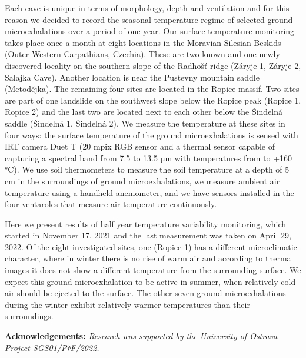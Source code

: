 {Each cave is unique in terms of morphology, depth and ventilation and for this reason we decided to record the seasonal temperature regime of selected ground microexhalations over a period of one year. Our surface temperature monitoring takes place once a month at eight locations in the Moravian-Silesian Beskids (Outer Western Carpathians, Czechia). These are two known and one newly discovered locality on the southern slope of the Radhošť ridge (Záryje 1, Záryje 2, Salajka Cave). Another location is near the Pustevny mountain saddle (Metodějka). The remaining four sites are located in the Ropice massif. Two sites are part of one landslide on the southwest slope below the Ropice peak (Ropice 1, Ropice 2) and the last two are located next to each other below the Šindelná saddle (Šindelná 1, Šindelná 2). We measure the temperature at these sites in four ways: the surface temperature of the ground microexhalations is sensed with IRT camera Duet T (20 mpix RGB sensor and a thermal sensor capable of capturing a spectral band from 7.5 to 13.5 µm with temperatures from  to +160 °C). We use soil thermometers to measure the soil temperature at a depth of 5 cm in the surroundings of ground microexhalations, we measure ambient air temperature using a handheld anemometer, and we have sensors installed in the four ventaroles that measure air temperature continuously.

Here we present results of half year temperature variability monitoring, which started in November 17, 2021 and the last measurement was taken on April 29, 2022. Of the eight investigated sites, one (Ropice 1) has a different microclimatic character, where in winter there is no rise of warm air and according to thermal images it does not show a different temperature from the surrounding surface. We expect this ground microexhalation to be active in summer, when relatively cold air should be ejected to the surface. The other seven ground microexhalations during the winter exhibit relatively warmer temperatures than their surroundings.

\vspace{0.5em}
\noindent
\textbf{Acknowledgements:}
\textit{Research was supported by the University of Ostrava Project SGS01/PřF/2022.}	
}
